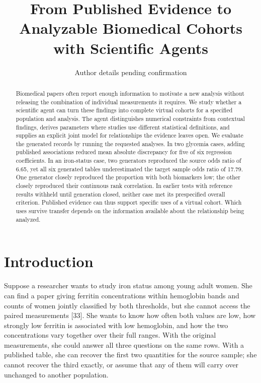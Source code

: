 \documentclass[sigconf,review]{acmart}
\begin{document}
\title{From Published Evidence to Analyzable Biomedical Cohorts with Scientific Agents}
\author{Author details pending confirmation}
\begin{abstract}

Biomedical papers often report enough information to motivate a new analysis without releasing the combination of individual measurements it requires. We study whether a scientific agent can turn these findings into complete virtual cohorts for a specified population and analysis. The agent distinguishes numerical constraints from contextual findings, derives parameters where studies use different statistical definitions, and supplies an explicit joint model for relationships the evidence leaves open. We evaluate the generated records by running the requested analyses. In two glycemia cases, adding published associations reduced mean absolute discrepancy for five of six regression coefficients. In an iron-status case, two generators reproduced the source odds ratio of 6.65, yet all six generated tables underestimated the target sample odds ratio of 17.79. One generator closely reproduced the proportion with both biomarkers low; the other closely reproduced their continuous rank correlation. In earlier tests with reference results withheld until generation closed, neither case met its prespecified overall criterion. Published evidence can thus support specific uses of a virtual cohort. Which uses survive transfer depends on the information available about the relationship being analyzed.

\end{abstract}

\maketitle

\section{Introduction}

Suppose a researcher wants to study iron status among young adult women. She can find a paper giving ferritin concentrations within hemoglobin bands and counts of women jointly classified by both thresholds, but she cannot access the paired measurements [33]. She wants to know how often both values are low, how strongly low ferritin is associated with low hemoglobin, and how the two concentrations vary together over their full ranges. With the original measurements, she could answer all three questions on the same rows. With a published table, she can recover the first two quantities for the source sample; she cannot recover the third exactly, or assume that any of them will carry over unchanged to another population.
\end{document}
